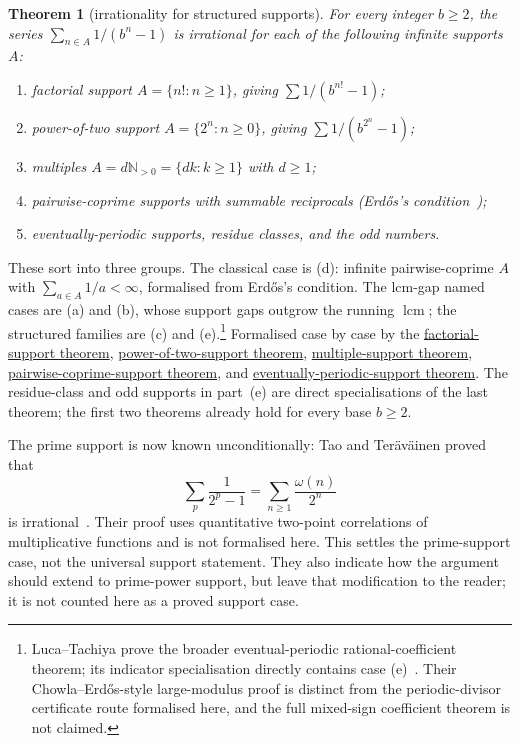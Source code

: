 \documentclass[11pt]{article}
\newcommand{\commit}{ebc98ee71f6819bd9fe344a0bb343542c604e533}
\newcommand{\repobase}{https://github.com/wcook04/plectis-lean-erdos249-257/blob/\commit}
\newcommand{\PK}{Erdos249257}
\newcommand{\lword}[4]{\href{\repobase/\PK/#1\#L#2}{#4}}
\newtheorem{theorem}{Theorem}[section]
\theoremstyle{definition}
\theoremstyle{remark}
\newcommand{\Npos}{\mathbb{N}_{>0}}
\newcommand{\lcm}{\operatorname{lcm}}
\begin{document}
\begin{theorem}[irrationality for structured supports]\label{res:support}
For every integer $b\ge2$, the series $\sum_{n\in A} 1/(b^n-1)$ is irrational for
each of the following infinite supports $A$:
\begin{enumerate}[label=\textup{(\alph*)},leftmargin=2em]
\item factorial support $A=\{n! : n\ge1\}$, giving $\sum 1/(b^{n!}-1)$;
\item power-of-two support $A=\{2^n : n\ge0\}$, giving $\sum 1/(b^{2^n}-1)$;
\item multiples $A=d\Npos=\{dk:k\ge1\}$ with $d\ge1$;
\item pairwise-coprime supports with summable reciprocals (Erd\H{o}s's
condition~\cite[Theorem, p.~222]{erdos1968});
\item eventually-periodic supports, residue classes, and the odd numbers.
\end{enumerate}
\end{theorem}
\noindent These sort into three groups. The classical case is (d): infinite
pairwise-coprime $A$ with $\sum_{a\in A}1/a<\infty$, formalised from Erd\H{o}s's
condition. The lcm-gap named cases are (a) and (b), whose support gaps outgrow the
running $\lcm$; the structured families are (c) and (e).\footnote{Luca--Tachiya
prove the broader eventual-periodic rational-coefficient theorem; its indicator
specialisation directly contains case (e)~\cite{lucatachiya}. Their
Chowla--Erd\H{o}s-style large-modulus proof is distinct from the periodic-divisor
certificate route formalised here, and the full mixed-sign coefficient theorem is
not claimed.}
\noindent Formalised case by case by the
\lword{CertificateKernel.lean}{5707}{irrational_erdosSum_factorial_support}{factorial-support theorem},
\lword{CertificateKernel.lean}{5731}{irrational_erdosSum_two_pow_support}{power-of-two-support theorem},
\lword{CertificateKernel.lean}{8775}{irrational_erdosSupportSeries_multiples}{multiple-support theorem},
\lword{CertificateKernel.lean}{10448}{irrational_erdosSupportSeries_pairwise_coprime}{pairwise-coprime-support theorem},
and
\lword{CertificateKernel.lean}{11276}{irrational_erdosSupportSeries_eventuallyPeriodic}{eventually-periodic-support theorem}.
The residue-class and odd supports in part~\textup{(e)} are direct
specialisations of the last theorem; the first two theorems already hold for
every base \(b\geq2\).

The prime support is now known unconditionally: Tao and Ter\"av\"ainen proved
that
\[
  \sum_p\frac1{2^p-1}=\sum_{n\ge1}\frac{\omega(n)}{2^n}
\]
is irrational~\cite[Theorem~1.3]{taoteravainen}. Their proof uses quantitative two-point
correlations of multiplicative functions and is not formalised here. This
settles the prime-support case, not the universal support statement.
They also indicate how the argument should extend to
prime-power support, but leave that modification to the reader; it is not
counted here as a proved support case.
\end{document}
